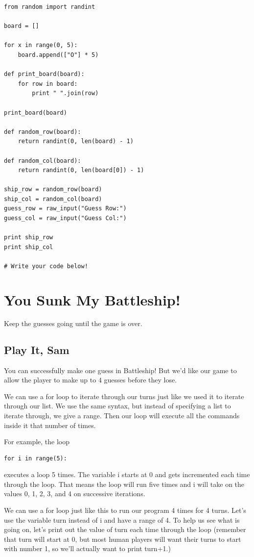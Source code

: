 \documentclass[12pt,a4paper,final,twoside,onecolumn,titlepage]{book}
\begin{document}
\begin{lstlisting}
from random import randint

board = []

for x in range(0, 5):
    board.append(["O"] * 5)

def print_board(board):
    for row in board:
        print " ".join(row)

print_board(board)

def random_row(board):
    return randint(0, len(board) - 1)

def random_col(board):
    return randint(0, len(board[0]) - 1)

ship_row = random_row(board)
ship_col = random_col(board)
guess_row = raw_input("Guess Row:")
guess_col = raw_input("Guess Col:")

print ship_row
print ship_col

# Write your code below!

\end{lstlisting}

\section{You Sunk My Battleship!}
Keep the guesses going until the game is over.
\subsection{Play It, Sam}

You can successfully make one guess in Battleship! But we’d like our game to allow the player to make up to 4 guesses before they lose.

We can use a for loop to iterate through our turns just like we used it to iterate through our list. We use the same syntax, but instead of specifying a list to iterate through, we give a range. Then our loop will execute all the commands inside it that number of times.

For example, the loop
\begin{lstlisting}
for i in range(5):
\end{lstlisting}
executes a loop 5 times. The variable i starts at 0 and gets incremented each time through the loop. That means the loop will run five times and i will take on the values 0, 1, 2, 3, and 4 on successive iterations.

We can use a for loop just like this to run our program 4 times for 4 turns. Let’s use the variable turn instead of i and have a range of 4. To help us see what is going on, let’s print out the value of turn each time through the loop (remember that turn will start at 0, but most human players will want their turns to start with number 1, so we’ll actually want to print turn+1.)
\end{document}
